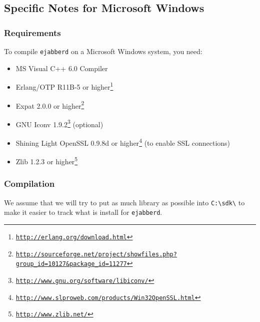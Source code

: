 \documentclass[a4paper,10pt]{book}
\newcommand{\ind}[1]{\begin{latexonly}\index{#1}\end{latexonly}}
\newcommand{\ejabberd}{\texttt{ejabberd}}
\gdef\footahref#1#2{#2\footnote{\href{#1}{\texttt{#1}}}}
\begin{document}
\subsection{Specific Notes for Microsoft Windows}
\label{windows}
\ind{install!windows}

\subsubsection{Requirements}
\label{windowsreq}

To compile \ejabberd{} on a Microsoft Windows system, you need:
\begin{itemize}
\item MS Visual C++ 6.0 Compiler
\item \footahref{http://erlang.org/download.html}{Erlang/OTP R11B-5 or higher}
\item \footahref{http://sourceforge.net/project/showfiles.php?group\_id=10127\&package\_id=11277}{Expat 2.0.0 or higher}
\item
\footahref{http://www.gnu.org/software/libiconv/}{GNU Iconv 1.9.2}
(optional)
\item \footahref{http://www.slproweb.com/products/Win32OpenSSL.html}{Shining Light OpenSSL 0.9.8d or higher}
(to enable SSL connections)
\item \footahref{http://www.zlib.net/}{Zlib 1.2.3 or higher}
\end{itemize}


\subsubsection{Compilation}
\label{windowscom}

We assume that we will try to put as much library as possible into \verb|C:\sdk\| to make it easier to track what is install for \ejabberd{}.
\end{document}
